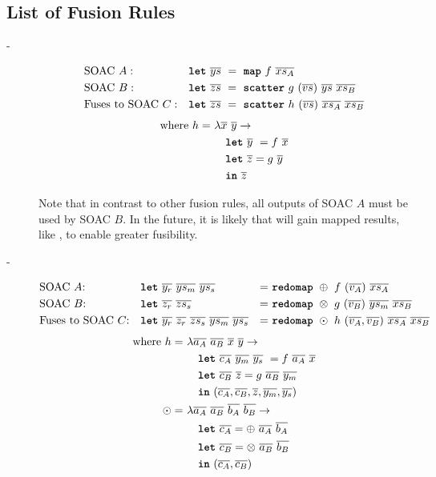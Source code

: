 \subsection{List of Fusion Rules}

\begin{description}
\item[-]
  \begin{align*}
    &\mbox{SOAC}~A: &\hfill & \kw{let}~\seq{ys}~=~\kw{map}~f~\seq{xs_{A}}\\
    &\mbox{SOAC}~B: &\hfill & \kw{let}~\seq{zs}~=~\kw{scatter}~g~(\seq{vs})~\seq{ys}~\seq{xs_{B}} \\
    &\mbox{Fuses to SOAC}~C: &\hfill& \kw{let}~\seq{zs}~=~\kw{scatter}~h~(\seq{vs})~\seq{xs_{A}}~\seq{xs_{B}} \\
  \end{align*}
  \begin{align*}
    \text{where}~h =~& \lambda \overline{x}~\overline{y} \rightarrow \\
      & \quad \mbox{\texttt{\bfseries{let}}}~\overline{y}~ = f~\overline{x} \\
      & \quad \mbox{\texttt{\bfseries{let}}}~\overline{z} = g~\overline{y} \\
      & \quad \mbox{\texttt{\bfseries{in}}}~\overline{z}
  \end{align*}

  Note that in contrast to other fusion rules, all outputs of SOAC $A$
  must be used by SOAC $B$.  In the future, it is likely that
   will gain mapped results, like , to enable
  greater fusibility.

\item[-]
  \begin{align*}
    &\mbox{SOAC $A$:} &\hfill& \kw{let}~\seq{y_{r}}~\seq{ys_{m}}~\seq{ys_{s}}&=~&\kw{redomap}~\oplus~f~(\seq{v_{A}})~\seq{xs_{A}} \\
    &\mbox{SOAC $B$:} &\hfill& \kw{let}~\seq{z_{r}}~\seq{zs_{s}}&=~&\kw{redomap}~\otimes~g~(\seq{v_{B}})~\seq{ys_{m}}~\seq{xs_{B}} \\
    &\mbox{Fuses to SOAC $C$:} &\hfill& \kw{let}~\seq{y_{r}}~\seq{z_{r}}~\seq{zs_{s}}~\seq{ys_{m}}~\seq{ys_{s}}&=~&\kw{redomap}~\odot~h~(\seq{v_{A}},\seq{v_{B}})~\seq{xs_{A}}~\seq{xs_{B}}
  \end{align*}
  \begin{align*}
    \mbox{where}~h =~& \lambda \overline{a_{A}}~\overline{a_{B}}~\overline{x}~\overline{y} \rightarrow \\
      & \quad \mbox{\texttt{\bfseries{let}}}~\overline{c_{A}}~\overline{y_{m}}~\overline{y_{s}}~ = f~\overline{a_{A}}~\overline{x} \\
      & \quad \mbox{\texttt{\bfseries{let}}}~\overline{c_{B}}~\overline{z} = g~\overline{a_{B}}~\overline{y_{m}} \\
        & \quad \mbox{\texttt{\bfseries{in}}}~(\overline{c_{A}},\overline{c_{B}},\overline{z},\overline{y_{m}},\overline{y_{s}}) \\
    \odot =~& \lambda \overline{a_{A}}~\overline{a_{B}}~\overline{b_{A}}~\overline{b_{B}} \rightarrow \\
        & \quad \mbox{\texttt{\bfseries{let}}}~\overline{c_{A}} = \oplus~\overline{a_{A}}~\overline{b_{A}} \\
        & \quad \mbox{\texttt{\bfseries{let}}}~\overline{c_{B}} = \otimes~\overline{a_{B}}~\overline{b_{B}} \\
        & \quad \mbox{\texttt{\bfseries{in}}}~(\overline{c_{A}}, \overline{c_{B}})
  \end{align*}


\end{description}
